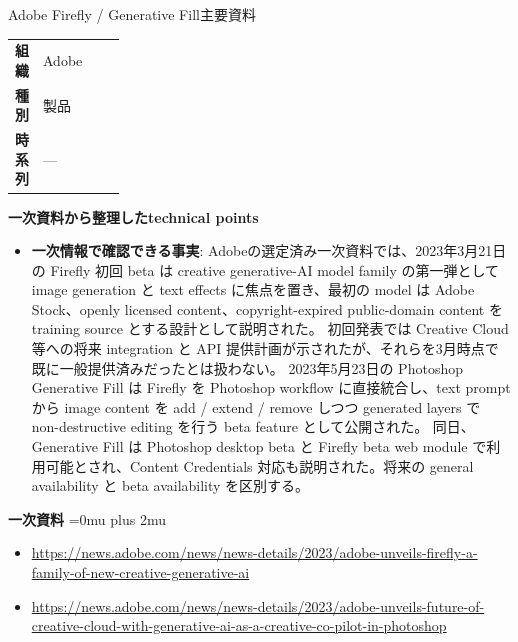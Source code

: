 \begin{technicalnote}{Adobe Firefly / Generative Fill}{主要資料}
\begingroup
\begin{tabularx}{\linewidth}{@{}>{\bfseries}p{0.22\linewidth}X@{}}
組織 & Adobe \\
種別 & 製品 \\
時系列 & — \\
\end{tabularx}
\smallskip
{\bfseries 一次資料から整理したtechnical points}
\begin{itemize}[leftmargin=1.5em,itemsep=0.35em]
\item \textbf{一次情報で確認できる事実}: Adobeの選定済み一次資料では、2023年3月21日の Firefly 初回 beta は creative generative-AI model family の第一弾として image generation と text effects に焦点を置き、最初の model は Adobe Stock、openly licensed content、copyright-expired public-domain content を training source とする設計として説明された。 初回発表では Creative Cloud 等への将来 integration と API 提供計画が示されたが、それらを3月時点で既に一般提供済みだったとは扱わない。 2023年5月23日の Photoshop Generative Fill は Firefly を Photoshop workflow に直接統合し、text prompt から image content を add / extend / remove しつつ generated layers で non-destructive editing を行う beta feature として公開された。 同日、Generative Fill は Photoshop desktop beta と Firefly beta web module で利用可能とされ、Content Credentials 対応も説明された。将来の general availability と beta availability を区別する。
\end{itemize}
\begin{minipage}{\linewidth}
\begin{samepage}
{\bfseries 一次資料}
\begingroup\sloppy
\Urlmuskip=0mu plus 2mu\relax
\begin{itemize}[leftmargin=1.5em,itemsep=0.25em]
\item {\scriptsize\url{https://news.adobe.com/news/news-details/2023/adobe-unveils-firefly-a-family-of-new-creative-generative-ai}}
\item {\scriptsize\url{https://news.adobe.com/news/news-details/2023/adobe-unveils-future-of-creative-cloud-with-generative-ai-as-a-creative-co-pilot-in-photoshop}}
\end{itemize}
\endgroup
\end{samepage}
\end{minipage}
\endgroup
\end{technicalnote}
\medskip
